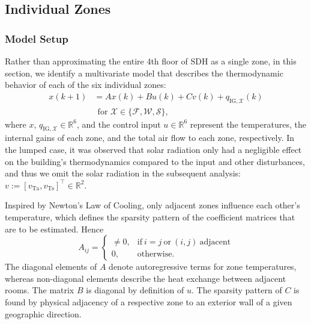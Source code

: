 \subsection{Individual Zones}\label{sec:Indiv_Zones}
\subsubsection{Model Setup}
Rather than approximating the entire 4th floor of SDH as a single zone, in this section, we identify a multivariate model that describes the thermodynamic behavior of each of the six individual zones:
\begin{equation}
\begin{aligned}\label{eq:temp_propagation_indiv}
x(k+1) &= A x(k) + B u(k) + C v(k) + q_{\text{IG},\mathcal{X}}(k) \\
& ~~ \text{for } \mathcal{X} \in \lbrace \mathcal{F}, \mathcal{W}, \mathcal{S} \rbrace,
\end{aligned}
\end{equation}
where $x$, $q_{\text{IG},\mathcal{X}} \in \mathbb{R}^6$, and the control input $u \in \mathbb{R}^6$ represent the temperatures, the internal gains of each zone, and the total air flow to each zone, respectively. In the lumped case, it was observed that solar radiation only had a negligible effect on the building's thermodynamics compared to the input and other disturbances, and thus we omit the solar radiation in the subsequent analysis: $v := \left[ v_\text{Ta}, v_\text{Ts} \right]^\top \in \mathbb{R}^2$.

Inspired by Newton's Law of Cooling, only adjacent zones influence each other's temperature, which defines the sparsity pattern of the coefficient matrices that are to be estimated. Hence 
\begin{equation}
A_{ij} = \begin{cases}
      \neq 0, & \text{if}\ i=j~\text{or}~(i,j)~ \text{adjacent}  \\
      0, & \text{otherwise.}
    \end{cases}
\end{equation}
The diagonal elements of $A$ denote autoregressive terms for zone temperatures, whereas non-diagonal elements describe the heat exchange between adjacent rooms. The matrix $B$ is diagonal by definition of $u$. The sparsity pattern of $C$ is found by physical adjacency of a respective zone to an exterior wall of a given geographic direction.

